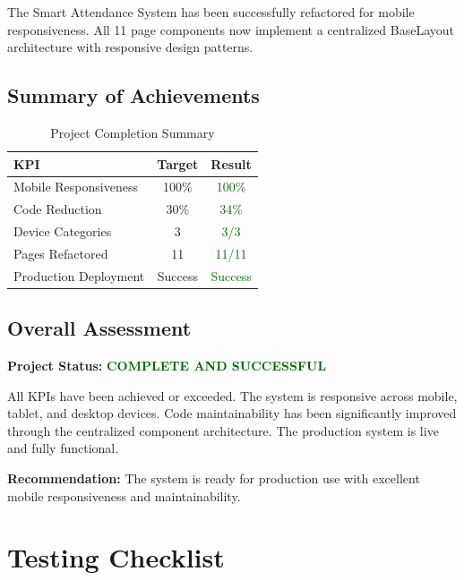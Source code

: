 \documentclass[11pt, a4paper]{report}
\begin{document}
The Smart Attendance System has been successfully refactored for mobile responsiveness. All 11 page components now implement a centralized BaseLayout architecture with responsive design patterns.

\section{Summary of Achievements}

\begin{table}[H]
    \centering
    \caption{Project Completion Summary}
    \begin{tabular}{|l|c|c|}
        \hline
        \textbf{KPI} & \textbf{Target} & \textbf{Result} \\
        \hline
        Mobile Responsiveness & 100\% & \textcolor{darkgreen}{100\%} \\
        Code Reduction & 30\% & \textcolor{darkgreen}{34\%} \\
        Device Categories & 3 & \textcolor{darkgreen}{3/3} \\
        Pages Refactored & 11 & \textcolor{darkgreen}{11/11} \\
        Production Deployment & Success & \textcolor{darkgreen}{Success} \\
        \hline
    \end{tabular}
\end{table}

\section{Overall Assessment}

\textbf{Project Status:} \textcolor{darkgreen}{\textbf{COMPLETE AND SUCCESSFUL}}

All KPIs have been achieved or exceeded. The system is responsive across mobile, tablet, and desktop devices. Code maintainability has been significantly improved through the centralized component architecture. The production system is live and fully functional.

\textbf{Recommendation:} The system is ready for production use with excellent mobile responsiveness and maintainability.

\appendix

\chapter{Testing Checklist}
\end{document}
